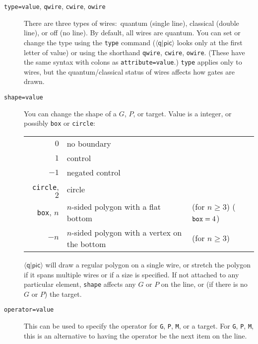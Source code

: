 \documentclass[twoside,12pt]{article}
\newcommand{\qpic}{$\langle\mathsf{q}|\mathsf{pic}\rangle$\xspace}
\begin{document}
\begin{description}
\item[{\tt type=value}, {\tt qwire}, {\tt cwire}, {\tt owire}] There are
  three types of wires:\ quantum (single line), classical (double line),
  or off (no line).  By default, all wires are quantum.  You can set or change
  the type using the {\tt type} command (\qpic looks only at the first letter
  of value) or using the shorthand {\tt qwire}, {\tt cwire}, {\tt owire}.
  (These have the same syntax with colons as {\tt attribute=value}.)
  {\tt type} applies only to wires, but the quantum/classical status of
  wires affects how gates are drawn.

\begin{minipage}[b]{2in}

\end{minipage} \hfill 

\item[{\tt shape=value}] You can change the shape of
  a $G$, $P$, or target.  Value is a integer, or possibly {\tt box} or {\tt circle}:
  \begin{center}
    \begin{tabular}{r|ll}
      $0$ & no boundary \\
      $1$ & control \\
      $-1$ & negated control \\
      {\tt circle}, $2$ & circle \\
      {\tt box}, $n$ & $n$-sided polygon with a flat bottom & (for $n \ge 3$) (${\tt box}=4$)\\
      $-n$ & $n$-sided polygon with a vertex on the bottom & (for $n \ge 3$)
    \end{tabular}
  \end{center}
  \qpic will draw a regular polygon on a single wire, or stretch the polygon if it
  spans multiple wires or if a size is specified.
  If not attached to any particular element, {\tt shape} affects
  any $G$ or $P$ on the line, or (if there is no $G$ or $P$) the target.

\begin{minipage}[b]{3in}

\end{minipage} \hfill 

\item[{\tt operator=value}] This can be used to specify the operator for
  {\tt G}, {\tt P}, {\tt M}, or a target.  For {\tt G}, {\tt P}, {\tt M}, this is
  an alternative to having the operator be the next item on the line.


\end{description}
\end{document}
